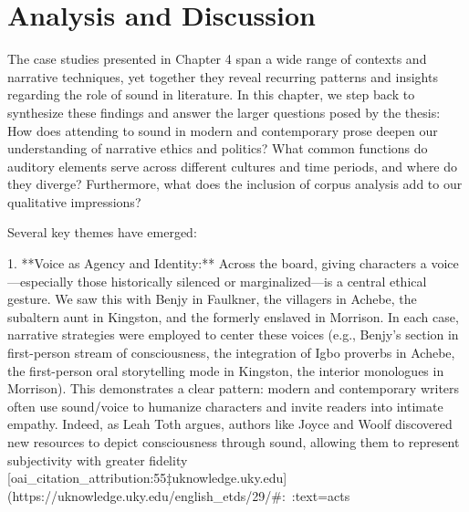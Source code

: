 \documentclass[12pt]{report}
\begin{document}
\chapter{Analysis and Discussion}
The case studies presented in Chapter 4 span a wide range of contexts and narrative techniques, yet together they reveal recurring patterns and insights regarding the role of sound in literature. In this chapter, we step back to synthesize these findings and answer the larger questions posed by the thesis: How does attending to sound in modern and contemporary prose deepen our understanding of narrative ethics and politics? What common functions do auditory elements serve across different cultures and time periods, and where do they diverge? Furthermore, what does the inclusion of corpus analysis add to our qualitative impressions?

Several key themes have emerged:

1. **Voice as Agency and Identity:** Across the board, giving characters a voice—especially those historically silenced or marginalized—is a central ethical gesture. We saw this with Benjy in Faulkner, the villagers in Achebe, the subaltern aunt in Kingston, and the formerly enslaved in Morrison. In each case, narrative strategies were employed to center these voices (e.g., Benjy’s section in first-person stream of consciousness, the integration of Igbo proverbs in Achebe, the first-person oral storytelling mode in Kingston, the interior monologues in Morrison). This demonstrates a clear pattern: modern and contemporary writers often use sound/voice to humanize characters and invite readers into intimate empathy. Indeed, as Leah Toth argues, authors like Joyce and Woolf discovered new resources to depict consciousness through sound, allowing them to represent subjectivity with greater fidelity [oai_citation_attribution:55‡uknowledge.uky.edu](https://uknowledge.uky.edu/english_etds/29/#:~:text=acts%
\end{document}
